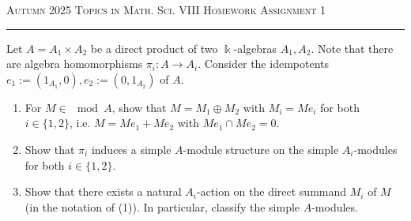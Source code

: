 \documentclass[12pt]{article}
\begin{document}
{\scshape Autumn 2025} \hfill {\scshape \large Topics in Math. Sci. VIII} \hfill {\scshape Homework Assignment 1}
\smallskip

\hrule

\bigskip

\begin{question}
Let $A=A_1\times A_2$ be a direct product of two $\Bbbk$-algebras $A_1, A_2$.
Note that there are algebra homomorphisms $\pi_i : A\to A_i$.
Consider the idempotents $e_1:=(1_{A_1},0), e_2:=(0,1_{A_2})$ of $A$.
\begin{enumerate}
\item For $M\in \mod A$, show that $M=M_1\oplus M_2$ with $M_i=Me_i$ for both $i\in\{1,2\}$, i.e. $M=Me_1+Me_2$ with $Me_1\cap Me_2=0$.

\item Show that $\pi_i$ induces a simple $A$-module structure on the simple $A_i$-modules for both $i\in\{1,2\}$.

\item Show that there exists a natural $A_i$-action on the direct summand $M_i$ of $M$ (in the notation of (1)).  In particular, classify the simple $A$-modules.
\end{enumerate}
\end{question}
\end{document}
